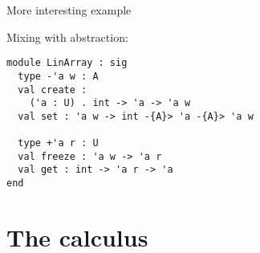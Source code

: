 \documentclass[xcolor=svgnames,11pt]{beamer}
\begin{document}
\begin{frame}[fragile]{More interesting example}

  Mixing with abstraction:
\begin{lstlisting}
module LinArray : sig
  type -'a w : A
  val create :
    ('a : U) . int -> 'a -> 'a w
  val set : 'a w -> int -{A}> 'a -{A}> 'a w

  type +'a r : U
  val freeze : 'a w -> 'a r
  val get : int -> 'a r -> 'a 
end
\end{lstlisting}
\end{frame}

\section{The calculus}



\end{document}
